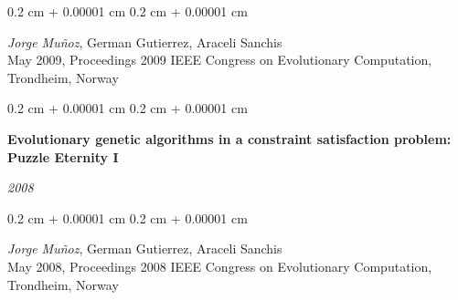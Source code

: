 \documentclass[10pt, letterpaper]{article}
\newenvironment{onecolentry}{
	\begin{adjustwidth}{
		0.2 cm + 0.00001 cm
	}{
		0.2 cm + 0.00001 cm
	}
	}{
	\end{adjustwidth}
} %
\newenvironment{twocolentry}[2][]{
	\onecolentry
	\def\secondColumn{#2}
	\setcolumnwidth{\fill, 5.5 cm}
	\begin{paracol}{2}
	}{
		\switchcolumn \raggedleft \secondColumn
	\end{paracol}
	\endonecolentry
} %
\begin{document}
	\vspace{0.10 cm}
	\begin{onecolentry}
		\textit{Jorge Muñoz}, German Gutierrez, Araceli Sanchis\\
		May 2009, Proceedings 2009 IEEE Congress on Evolutionary Computation, Trondheim, Norway
	\end{onecolentry}

	\vspace{0.2 cm}

	\begin{twocolentry}{
		\textit{2008}}
		\textbf{Evolutionary genetic algorithms in a constraint satisfaction problem: Puzzle Eternity I}
	\end{twocolentry}

	\vspace{0.10 cm}
	\begin{onecolentry}
		\textit{Jorge Muñoz}, German Gutierrez, Araceli Sanchis\\
		May 2008, Proceedings 2008 IEEE Congress on Evolutionary Computation, Trondheim, Norway
	\end{onecolentry}
\end{document}
